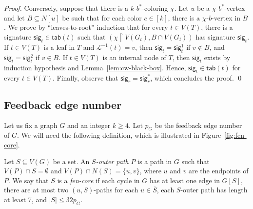 \documentclass[runningheads, envcountsame]{llncs}
\newcommand{\seq}{\subseteq}
\newcommand{\ca}{\mathcal}
\newcommand\csig{\mathsf{sig}}
\newcommand\tab{\mathsf{tab}}
\begin{document}
\begin{proof}
Conversely, suppose that there is a $k$-$b^*$-coloring $\chi$.
Let $u$ be a $\chi$-$b^*$-vertex and let $B \seq N[u]$ be such that for each color $c \in [k]$, there is a $\chi$-$b$-vertex in $B$.
We prove by ``leaves-to-root'' induction that for every $t \in V(T)$, there is a signature $\csig_t \in \tab(t)$ such that $(\chi \upharpoonright V(G_t), B \cap V(G_t))$ has signature $\csig_t$.
If $t \in V(T)$ is a leaf in $T$ and $\ca L^{-1}(t) = v$, then $\csig_t = \csig_t^1$ if $v \notin B$, and $\csig_t = \csig_t^2$ if $v \in B$.
If $t \in V(T)$ is an internal node of $T$, then $\csig_t$ exists by induction hypothesis and Lemma~\ref{lem:cw-black-box}.
Hence, $\csig_t \in \tab(t)$ for every $t \in V(T)$.
Finally, observe that $\csig_r = \csig_r^*$, which concludes the proof.
\qed\end{proof}

\subsection{Feedback edge number}

\newcommand{\red}{\textsf{red}}

Let us fix a graph $G$ and an integer $k \ge 4$.
Let $p_G$ be the feedback edge number of $G$.
We will need the following definition, which is illustrated in Figure~\ref{fig:fen-core}.

\begin{definition}\label{def:fen-core}
Let $S \seq V(G)$ be a set.
An \emph{$S$-outer path} $P$ is a path in $G$ such that $V(P) \cap S = \emptyset$ and $V(P) \cap N(S) = \{u, v\}$, where $u$ and $v$ are the endpoints of $P$.
We say that $S$ is a \emph{fen-core} if each cycle in $G$ has at least one edge in $G[S]$, there are at most two $(u, S)$-paths for each $u \in \overline{S}$, each $S$-outer path has length at least 7, and $|S| \le 32p_G$.
\end{definition}
\end{document}
